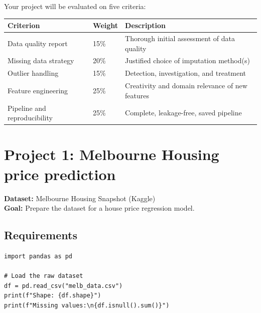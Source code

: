 Your project will be evaluated on five criteria:

\begin{longtable}{p{4cm}p{3cm}p{6cm}}
\toprule
\textbf{Criterion} & \textbf{Weight} & \textbf{Description} \\
\midrule
Data quality report & 15\% & Thorough initial assessment of data quality \\
Missing data strategy & 20\% & Justified choice of imputation method(s) \\
Outlier handling & 15\% & Detection, investigation, and treatment \\
Feature engineering & 25\% & Creativity and domain relevance of new features \\
Pipeline and reproducibility & 25\% & Complete, leakage-free, saved pipeline \\
\bottomrule
\end{longtable}

\section{Project 1: Melbourne Housing price prediction}

\textbf{Dataset:} Melbourne Housing Snapshot (Kaggle)\\
\textbf{Goal:} Prepare the dataset for a house price regression model.

\subsection{Requirements}

\begin{verbatim}
import pandas as pd

# Load the raw dataset
df = pd.read_csv("melb_data.csv")
print(f"Shape: {df.shape}")
print(f"Missing values:\n{df.isnull().sum()}")
\end{verbatim}

